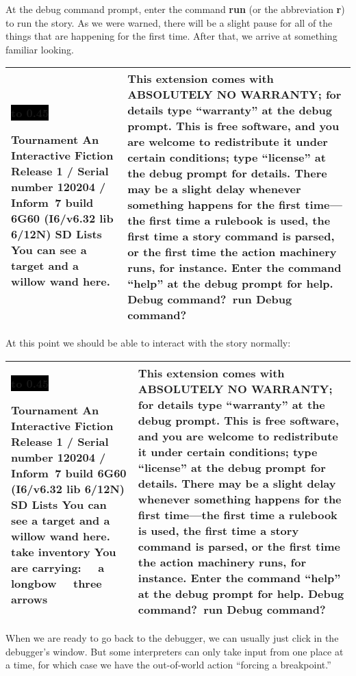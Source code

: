 \documentclass{book}
\newcommand{\n}{\hspace*{\fill}\newline}
\newcommand{\terp}[2]{\begin{center}\begin{tabular}{p{0.45\textwidth}|p{0.45\textwidth}}\midrule #1&#2\\\midrule\end{tabular}\end{center}}
\newcommand{\glkheading}[1]{\textbf{#1}}
\newcommand{\glkinput}[1]{\textbf{#1}}
\newcommand{\glkstatusline}[2]{\centerline{\colorbox{black}{\hbox to 0.45\textwidth{\textcolor{white}{#1\hfil #2}}}}}
\newcommand{\storyprompt}{\raisebox{1.5pt}{\(>\)}}
\newcommand{\cursor}{\raisebox{-1.5pt}{\RectangleThin}}
\begin{document}
At the debug command prompt, enter the command \glkinput{run} (or the
abbreviation \glkinput{r}) to run the story.  As we were warned, there will be a
slight pause for all of the things that are happening for the first time.  After
that, we arrive at something familiar looking.

\terp{\glkstatusline{Lists}{0/1}\n
  \glkheading{Tournament}\n
  An Interactive Fiction\n
  Release 1 / Serial number 120204 / Inform~7 build 6G60 (I6/v6.32 lib 6/12N) SD\n
  \n
  \glkheading{Lists}\n
  You can see a target and a willow wand here.\n
  \n
  \storyprompt\cursor}{%
  \n
  This extension comes with ABSOLUTELY NO WARRANTY; for details type ``warranty'' at the debug prompt.\n
  \n
  This is free software, and you are welcome to redistribute it under certain conditions; type ``license'' at the debug prompt for details.\n
  \n
  There may be a slight delay whenever something happens for the first time---the first time a rulebook is used, the first time a story command is parsed, or the first time the action machinery runs, for instance.\n
  \n
  Enter the command ``help'' at the debug prompt for help.\n
  \n
  Debug command?\ \glkinput{run}\n
  \n
  Debug command?\ \cursor}

At this point we should be able to interact with the story normally:

\terp{\glkstatusline{Lists}{0/2}\n
  \glkheading{Tournament}\n
  An Interactive Fiction\n
  Release 1 / Serial number 120204 / Inform~7 build 6G60 (I6/v6.32 lib 6/12N) SD\n
  \n
  \glkheading{Lists}\n
  You can see a target and a willow wand here.\n
  \n
  \storyprompt\glkinput{take inventory}\n
  You are carrying:\n
  \null\ \ a longbow\n
  \null\ \ three arrows\n
  \n
  \storyprompt\cursor}{%
  \n
  This extension comes with ABSOLUTELY NO WARRANTY; for details type ``warranty'' at the debug prompt.\n
  \n
  This is free software, and you are welcome to redistribute it under certain conditions; type ``license'' at the debug prompt for details.\n
  \n
  There may be a slight delay whenever something happens for the first time---the first time a rulebook is used, the first time a story command is parsed, or the first time the action machinery runs, for instance.\n
  \n
  Enter the command ``help'' at the debug prompt for help.\n
  \n
  Debug command?\ \glkinput{run}\n
  \n
  Debug command?\ \cursor}

\pagebreak

When we are ready to go back to the debugger, we can usually just click in the
debugger's window.  But some interpreters can only take input from one place at
a time, for which case we have the out-of-world action ``forcing a breakpoint.''
\end{document}
